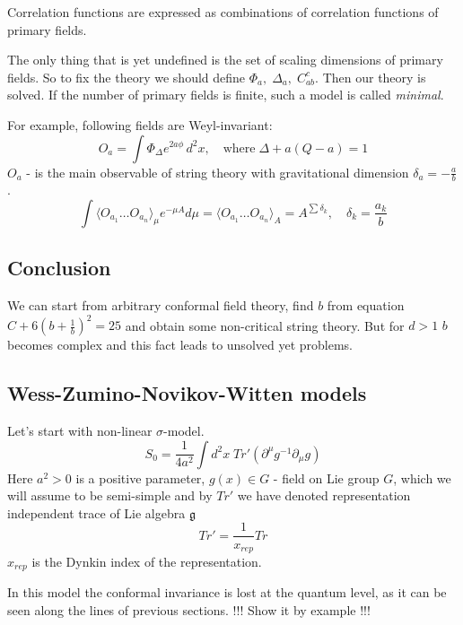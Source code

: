 \documentclass[a4paper,12pt]{article}
\theoremstyle{definition} \newtheorem{Def}{Definition}
\begin{document}
Correlation functions are expressed as combinations of correlation functions of primary fields.

The only thing that is yet undefined is the set of scaling dimensions of primary fields. So to fix the theory we should define $\Phi_a,\; \Delta_a,\; C^c_{ab}$. Then our theory is solved. If the number of primary fields is finite, such a model is called {\it minimal}.

For example, following fields are Weyl-invariant:
\begin{equation}
  \label{eq:68}
  O_a=\int \Phi_{\Delta}e^{2a\phi}\,d^2x,\quad \mbox{where}\;\Delta+a(Q-a)=1
\end{equation}
$O_a$ - is the main observable of string theory with gravitational dimension $\delta_a=-\frac{a}{b}$.
\begin{equation}
  \label{eq:69}
  \int\langle O_{a_1}\dots O_{a_n}\rangle_{\mu} e^{-\mu A}d\mu=\langle O_{a_1}\dots O_{a_n}\rangle_{A}=A^{\sum \delta_k},\quad \delta_k=\frac{a_k}{b}
\end{equation}
\subsection{Conclusion}
\label{sec:conclusion}

We can start from arbitrary conformal field theory, find $b$ from equation $C+6\left(b+\frac{1}{b}\right)^2=25$ and obtain some non-critical string theory. But for $d>1$ $b$ becomes complex and this fact leads to unsolved yet problems.


\subsection{Wess-Zumino-Novikov-Witten models}
\label{sec:WZNW}

Let's start with non-linear $\sigma$-model.
\begin{equation}
  \label{eq:48}
  S_0=\frac{1}{4a^2}\int d^2x\; Tr' (\partial^{\mu}g^{-1}\partial_{\mu}g)
\end{equation}
Here $a^2>0$ is a positive parameter, $g(x)\in G$ - field on Lie group $G$, which we will assume to be semi-simple and by $Tr'$ we have denoted representation independent trace of Lie algebra $\mathfrak{g} $
\begin{equation}
  \label{eq:70}
  Tr'=\frac{1}{x_{rep}}Tr
\end{equation}
$x_{rep}$ is the Dynkin index of the representation. 

In this model the conformal invariance is lost at the quantum level, as it can be seen along the lines of previous sections.
!!! Show it by example !!!
\end{document}
